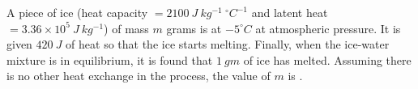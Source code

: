
\item A piece of ice (heat capacity \( = 2100 \ J \ kg^{-1} \ ^{\circ}C^{-1} \) and latent heat \( = 3.36 \times 10^{5} \ J \ kg^{-1} \)) of mass \( m \) grams is at \( -5^{\circ}C \) at atmospheric pressure. It is given \( 420 \ J \) of heat so that the ice starts melting. Finally, when the ice-water mixture is in equilibrium, it is found that \( 1 \ gm \) of ice has melted. Assuming there is no other heat exchange in the process, the value of \( m \) is \underline{\hspace{2.5cm}}.
